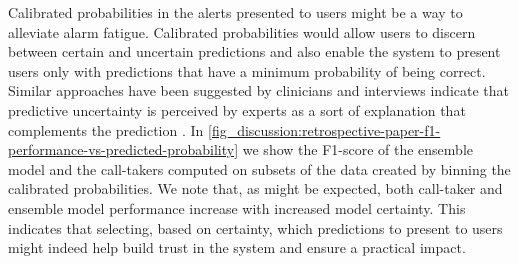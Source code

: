 Calibrated probabilities in the alerts presented to users might be a way to alleviate alarm fatigue. Calibrated probabilities would allow users to discern between certain and uncertain predictions and also enable the system to present users only with predictions that have a minimum probability of being correct. Similar approaches have been suggested by clinicians and interviews indicate that predictive uncertainty is perceived by experts as a sort of explanation that complements the prediction \cite{tonekaboni_what_2019}. In \cref{fig_discussion:retrospective-paper-f1-performance-vs-predicted-probability} we show the F1-score of the ensemble model and the call-takers computed on subsets of the data created by binning the calibrated probabilities. We note that, as might be expected, both call-taker and ensemble model performance increase with increased model certainty. This indicates that selecting, based on certainty, which predictions to present to users might indeed help build trust in the system and ensure a practical impact. 
